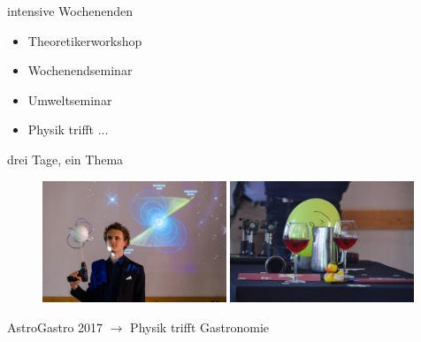 \documentclass[
]{beamer}
\begin{document}
\begin{frame}{intensive Wochenenden}
  \begin{minipage}{0.4\textwidth}
    \begin{itemize}
      \item Theoretikerworkshop
      \item Wochenendseminar
      \item Umweltseminar
      \item Physik trifft ...
    \end{itemize}
    drei Tage, ein Thema
  \end{minipage}
  \begin{minipage}{0.6\textwidth}
    \begin{figure}
      \centering
      \includegraphics[width=0.49\textwidth]{figure/astrogastro_2017_david}\hfill
      \includegraphics[width=0.49\textwidth]{figure/astrogastro_2017_wein}
     \end{figure}
     \begin{center}
      AstroGastro 2017 $\rightarrow$ Physik trifft Gastronomie
    \end{center}
  \end{minipage}
  

\end{frame}
\end{document}
